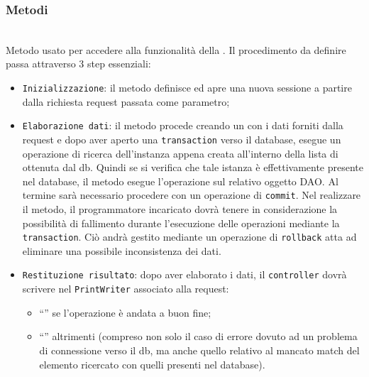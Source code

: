 \subsubsection*{Metodi}
\begin{description}

\item{}\\
	Metodo usato per accedere alla funzionalità della . Il procedimento da definire passa attraverso 3 step essenziali:
	\begin{itemize}
		\item \texttt{Inizializzazione}: il metodo definisce ed apre una nuova sessione a partire dalla richiesta request passata come parametro;
		\item \texttt{Elaborazione dati}: il metodo procede creando un  con i dati forniti dalla request e dopo aver aperto una \texttt{transaction} verso il database, esegue un operazione di ricerca dell'instanza appena creata all'interno della lista di  ottenuta dal db. Quindi se si verifica che tale istanza è effettivamente presente nel database, il metodo esegue l'operazione  sul relativo oggetto DAO. Al termine sarà necessario procedere con un operazione di \texttt{commit}. Nel realizzare il metodo, il programmatore incaricato dovrà tenere in considerazione la possibilità di fallimento durante l'esecuzione delle operazioni mediante la \texttt{transaction}. Ciò andrà gestito mediante un operazione di \texttt{rollback} atta ad eliminare una possibile inconsistenza dei dati.
		\item \texttt{Restituzione risultato}: dopo aver elaborato i dati, il \texttt{controller} dovrà scrivere nel \texttt{PrintWriter} associato alla request:
			\begin{itemize}
				\item ``'' se l'operazione è andata a buon fine;
				\item ``'' altrimenti (compreso non solo il caso di errore dovuto ad un problema di connessione verso il db, ma anche quello relativo al mancato match del elemento ricercato con quelli presenti nel database).
			\end{itemize}
	\end{itemize}

\end{description}


